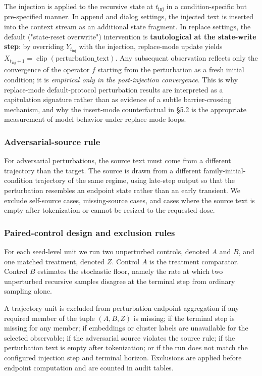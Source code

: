 \documentclass{article}
\theoremstyle{plain}
\theoremstyle{definition}
\begin{document}
The injection is applied to the recursive state at \(t_{\mathrm{inj}}\) in a condition-specific but pre-specified manner. In append and dialog settings, the injected text is inserted into the context stream as an additional state fragment. In replace settings, the default ("state-reset overwrite") intervention is \textbf{tautological at the state-write step}: by overriding \(Y_{t_{\mathrm{inj}}}\) with the injection, replace-mode update yields \(X_{t_{\mathrm{inj}}+1}=\operatorname{clip}(\text{perturbation\_text})\). Any subsequent observation reflects only the convergence of the operator \(f\) starting from the perturbation as a fresh initial condition; it is \textit{empirical only in the post-injection convergence}. This is why replace-mode default-protocol perturbation results are interpreted as a capitulation signature rather than as evidence of a subtle barrier-crossing mechanism, and why the insert-mode counterfactual in §5.2 is the appropriate measurement of model behavior under replace-mode loops.

\subsubsection*{Adversarial-source rule}

For adversarial perturbations, the source text must come from a different trajectory than the target. The source is drawn from a different family-initial-condition trajectory of the same regime, using late-step output so that the perturbation resembles an endpoint state rather than an early transient. We exclude self-source cases, missing-source cases, and cases where the source text is empty after tokenization or cannot be resized to the requested dose.

\subsubsection*{Paired-control design and exclusion rules}

For each seed-level unit we run two unperturbed controls, denoted \(A\) and \(B\), and one matched treatment, denoted \(Z\). Control \(A\) is the treatment comparator. Control \(B\) estimates the stochastic floor, namely the rate at which two unperturbed recursive samples disagree at the terminal step from ordinary sampling alone.

A trajectory unit is excluded from perturbation endpoint aggregation if any required member of the tuple \((A,B,Z)\) is missing; if the terminal step is missing for any member; if embeddings or cluster labels are unavailable for the selected observable; if the adversarial source violates the source rule; if the perturbation text is empty after tokenization; or if the run does not match the configured injection step and terminal horizon. Exclusions are applied before endpoint computation and are counted in audit tables.
\end{document}
